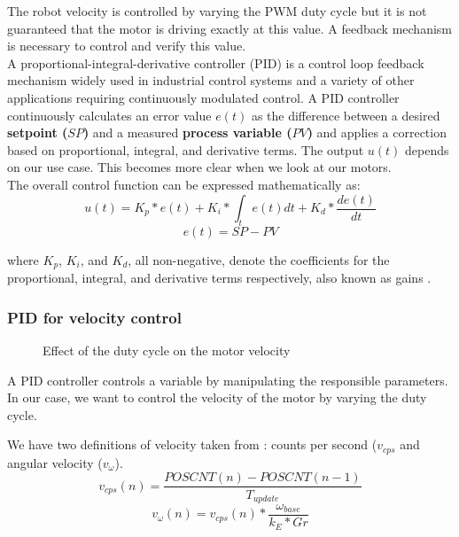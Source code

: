 The robot velocity is controlled by varying the PWM duty cycle but it is not guaranteed that the motor is driving exactly at this value. A feedback mechanism is necessary to control and verify this value.\\
\vskip 0.1in
\noindent
A proportional-integral-derivative controller (PID) is a control loop feedback mechanism widely used in industrial control systems and a variety of other applications requiring continuously modulated control. A PID controller continuously calculates an error value $e(t)$ as the difference between a desired \textbf{setpoint ($SP$)} and a measured \textbf{process variable ($PV$)} and applies a correction based on proportional, integral, and derivative terms. The output $u(t)$ depends on our use case. This becomes more clear when we look at our motors.\\
The overall control function can be expressed mathematically as: 
$$u(t)= K_{p}*e(t) + K_{i}*\int_t e(t) dt + K_{d}*\frac{d e(t)}{dt} $$
$$e(t) = SP - PV$$
 
where $K_p$, $K_i$, and $K_d$, all non-negative, denote the coefficients for the proportional, integral, and derivative terms respectively, also known as gains \cite{aastrom2002control}.

\subsubsection*{PID for velocity control}

\begin{figure}
    \centering
{}
    \caption{Effect of the duty cycle on the motor velocity} \label{fig:DC_V}
\end{figure}


A PID controller controls a variable by manipulating the responsible parameters. In our case, we want to control the velocity of the motor by varying the duty cycle. 

We have two definitions of velocity taken from \cite{alex}: counts per second ($v_{cps}$ and angular velocity ($v_\omega$).
$$v_{cps}(n) = \frac{POSCNT(n) - POSCNT(n-1)}{T_{update}}$$
$$v_{\omega}(n) = v_{cps}(n) * \frac{\omega_{base}}{k_{E}*Gr}$$

